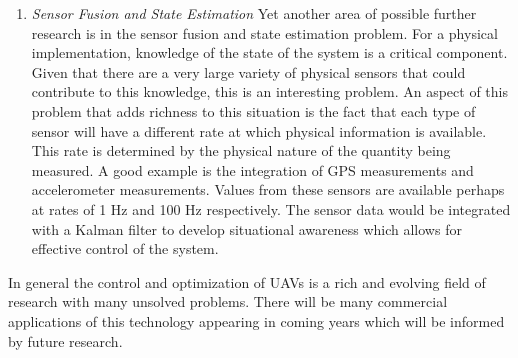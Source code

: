 \begin{enumerate}
\item \textit{Sensor Fusion and State Estimation} Yet another area of possible further research is in the sensor fusion and state estimation problem. For a physical implementation, knowledge of the state of the system is a critical component. Given that there are a very large variety of physical sensors that could contribute to this knowledge, this is an interesting problem. An aspect of this problem that adds richness to this situation is the fact that each type of sensor will have a different rate at which physical information is available. This rate is determined by the physical nature of the quantity being measured. A good example is the integration of GPS measurements and accelerometer measurements. Values from these sensors are available perhaps at rates of 1 Hz and 100 Hz respectively. The sensor data would be integrated with a Kalman filter to develop situational awareness which allows for effective control of the system.
\end{enumerate}

In general the control and optimization of UAVs is a rich and evolving field of research with many unsolved problems. There will be many commercial applications of this technology appearing in coming years which will be informed by future research.











